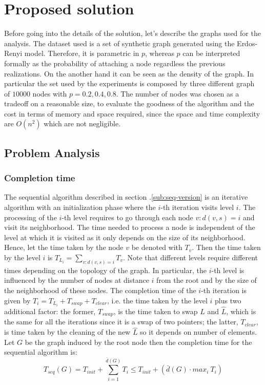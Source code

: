 \section{Proposed solution}
Before going into the details of the solution, let's describe the graphs 
used for the analysis. The dataset used is a set of synthetic 
graph generated using the Erdos-Renyi model.
Therefore, it is parametric in $p$, whereas $p$ can be interpreted formally as the probability
of attaching a node regardless the previous realizations. On the another hand it
can be seen as the density of the graph. In particular the set used by the experiments
is composed by three different graph of $10000$ nodes with $p = 0.2, 0.4, 0.8$. 
The number of nodes was chosen as a tradeoff on a reasonable size, to evaluate the
goodness of the algorithm and the cost in terms of memory and space required, since
the space and time complexity are $O(n^2)$ which are not negligible.
\subsection{Problem Analysis}
\subsubsection{Completion time}
The sequential algorithm described in section .\ref{sub:seq-version} is an
iterative algorithm with an initialization phase where the $i$-th iteration visits level $i$. The
processing of the $i$-th level requires to go through each node
$v : d(v, s) = i$ and visit its neighborhood.
The time needed to process a node is independent of the
level at which it is visited as it only depends on the size
of its neighborhood. Hence, let the time taken by the node $v$ be denoted 
with $T_v$. Then the time taken by the level $i$ is $T_{L_i} = \sum_{v : d(v, s) = i}T_v$.
Note that different levels require different times depending on the topology of the graph. In particular, the $i$-th level is influenced by the number of nodes at distance $i$ from the root 
and by the size of the neighborhood of these nodes. The completion time of the $i$-th
iteration is given by $T_i = T_{L_i} + T_{swap} + T_{clear}$, i.e. the time taken by the level $i$ plus two additional factor: the former, $T_{swap}$, is the time taken to swap 
$L$ and $\hat{L}$, which is the same for all the iterations since it is a swap of two pointers; the latter, $T_{clear}$, is
time taken by the cleaning of the new $\hat{L}$ so it depends on number of elements.
Let $G$ be the graph induced by the root node then the completion time for the sequential algorithm is:
$$
T_{seq}(G) = T_{init} + \sum^{\bar{d}(G)}_{i=1} T_i \leq  T_{init} + (\bar{d}(G) \cdot max_i \ T_i)
$$

